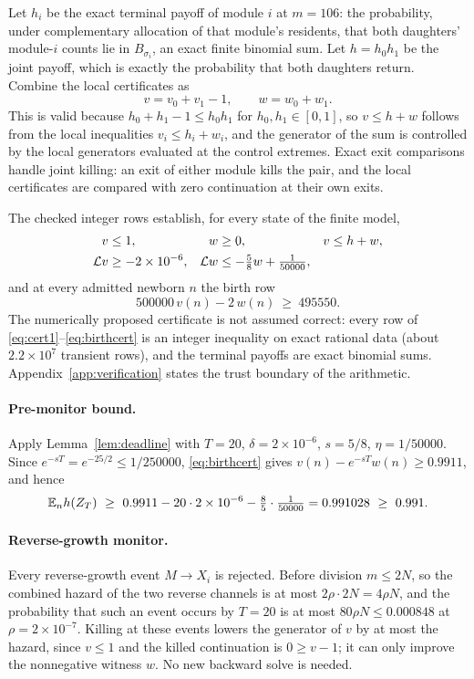 Let $h_i$ be the exact terminal payoff of module $i$ at $m=106$: the probability, under complementary allocation of that module's residents, that both daughters' module-$i$ counts lie in $B_{\sigma_i}$, an exact finite binomial sum. Let $h=h_0h_1$ be the joint payoff, which is exactly the probability that both daughters return. Combine the local certificates as
\[
 v=v_0+v_1-1,\qquad w=w_0+w_1 .
\]
This is valid because $h_0+h_1-1\le h_0h_1$ for $h_0,h_1\in[0,1]$, so $v\le h+w$ follows from the local inequalities $v_i\le h_i+w_i$, and the generator of the sum is controlled by the local generators evaluated at the control extremes. Exact exit comparisons handle joint killing: an exit of either module kills the pair, and the local certificates are compared with zero continuation at their own exits.

The checked integer rows establish, for every state of the finite model,
\begin{align}
 v&\le1,& w&\ge0,& v&\le h+w,\label{eq:cert1}\\
 \mathcal L v&\ge-2\times10^{-6},& \mathcal L w&\le-\tfrac58w+\tfrac1{50000},\label{eq:cert2}
\end{align}
and at every admitted newborn $n$ the birth row
\begin{equation}\label{eq:birthcert}
 500000\,v(n)-2\,w(n)\ \ge\ 495550 .
\end{equation}
The numerically proposed certificate is not assumed correct: every row of \eqref{eq:cert1}--\eqref{eq:birthcert} is an integer inequality on exact rational data (about $2.2\times10^7$ transient rows), and the terminal payoffs are exact binomial sums. Appendix~\ref{app:verification} states the trust boundary of the arithmetic.

\paragraph{Pre-monitor bound.}
Apply Lemma~\ref{lem:deadline} with $T=20$, $\delta=2\times10^{-6}$, $s=5/8$, $\eta=1/50000$. Since $e^{-sT}=e^{-25/2}\le1/250000$, \eqref{eq:birthcert} gives $v(n)-e^{-sT}w(n)\ge0.9911$, and hence
\[
 \EE_nh(Z_T)\ \ge\ 0.9911-20\cdot2\times10^{-6}-\tfrac{8}{5}\cdot\tfrac1{50000}=0.991028\ \ge\ 0.991 .
\]

\paragraph{Reverse-growth monitor.}
Every reverse-growth event $M\to X_i$ is rejected. Before division $m\le2N$, so the combined hazard of the two reverse channels is at most $2\rho\cdot2N=4\rho N$, and the probability that such an event occurs by $T=20$ is at most $80\rho N\le0.000848$ at $\rho=2\times10^{-7}$. Killing at these events lowers the generator of $v$ by at most the hazard, since $v\le1$ and the killed continuation is $0\ge v-1$; it can only improve the nonnegative witness $w$. No new backward solve is needed.

